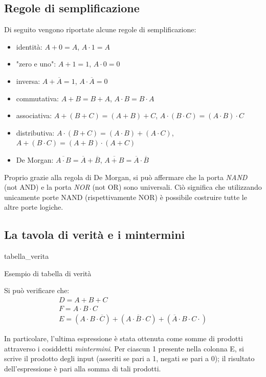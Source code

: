 \documentclass[class=book, crop=false]{standalone}
\begin{document}
\subsection{Regole di semplificazione}
\label{subsec:semplificazione}
Di seguito vengono riportate alcune regole di semplificazione:
\begin{itemize}
	\item identità: \(A+0=A\), \(A\cdot 1=A\)
	\item "zero e uno": \(A+1=1\), \(A\cdot 0=0\)
	\item inversa: \(A+\overline{A}=1\), \(A\cdot\overline{A}=0\)
	\item commutativa: \(A+B=B+A\), \(A\cdot B=B\cdot A\)
	\item associativa: \(A+(B+C)=(A+B)+C\), \(A\cdot(B\cdot C)=(A\cdot B)\cdot C\)
	\item distributiva: \(A\cdot(B+C)=(A\cdot B)+(A\cdot C)\), \(A+(B\cdot C)=(A+B)\cdot(A+C)\)
	\item De Morgan: \(\overline{A\cdot B} = \overline{A}+\overline{B}\), \(\overline{A+B} = \overline{A}\cdot\overline{B}\)
\end{itemize}
Proprio grazie alla regola di De Morgan, si può affermare che la porta \emph{NAND} (not AND) e la porta \emph{NOR} (not OR) sono universali. Ciò significa che utilizzando unicamente porte NAND (rispettivamente NOR) è possibile costruire tutte le altre porte logiche.

\subsection{La tavola di verità e i mintermini}
\label{subsec:mintermini}
\begin{table}[!h]
	\centering
	{tabella_verita}
	\caption{Esempio di tabella di verità}
	\label{tabella-verita}
\end{table}
Si può verificare che:
\begin{gather*}
D = A+B+C\\
F = A\cdot B\cdot C\\
E = (A\cdot B\cdot\overline{C}) + (A\cdot \overline{B} \cdot C) + (\overline{A} \cdot B\cdot C\cdot)
\end{gather*}

In particolare, l'ultima espressione è stata ottenuta come somme di prodotti attraverso i cosiddetti \emph{mintermini}. Per ciascun 1 presente nella colonna E, si scrive il prodotto degli input (asseriti se pari a 1, negati se pari a 0); il risultato dell'espressione è pari alla somma di tali prodotti.
\end{document}
